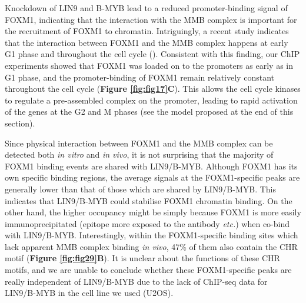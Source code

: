 Knockdown of LIN9 and B-MYB lead to a reduced promoter-binding signal of FOXM1, indicating that the interaction with the MMB complex is important for the recruitment of FOXM1 to chromatin. Intriguingly, a recent study indicates that the interaction between FOXM1 and the MMB complex happens at early G1 phase and throughout the cell cycle (\cite{sadasivam2012the}). Consistent with this finding, our ChIP experiments showed that FOXM1 was loaded on to the promoters as early as in G1 phase, and the promoter-binding of FOXM1 remain relatively constant throughout the cell cycle (\textbf{Figure \ref{fig:fig17}C}). This allows the cell cycle kinases to regulate a pre-assembled complex on the promoter, leading to rapid activation of the genes at the G2 and M phases (see the model proposed at the end of this section).

Since physical interaction between FOXM1 and the MMB complex can be detected both \textit{in vitro} and \textit{in vivo}, it is not surprising that the majority of FOXM1 binding events are shared with LIN9/B-MYB. Although FOXM1 has its own specific binding regions, the average signals at the FOXM1-specific peaks are generally lower than that of those which are shared by LIN9/B-MYB. This indicates that LIN9/B-MYB could stabilise FOXM1 chromatin binding. On the other hand, the higher occupancy might be simply because FOXM1 is more easily immunoprecipitated (epitope more exposed to the antibody \textit{etc.}) when co-bind with LIN9/B-MYB. Interestingly, within the FOXM1-specific binding sites which lack apparent MMB complex binding \textit{in vivo}, 47\% of them also contain the CHR motif (\textbf{Figure \ref{fig:fig29}B}). It is unclear about the functions of these CHR motifs, and we are unable to conclude whether these FOXM1-specific peaks are really independent of LIN9/B-MYB due to the lack of ChIP-seq data for LIN9/B-MYB in the cell line we used (U2OS).

